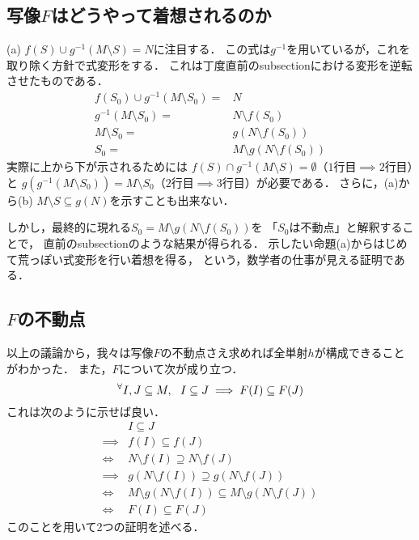 \documentclass[lualatex, ja=standard, a4paper]{bxjsarticle}
\newcommand{\tp}[2]{\texorpdfstring{#1}{#2}}
\begin{document}
    \subsection{写像\tp{$F$}{F}はどうやって着想されるのか}
    (a) $f(S) \cup g^{-1}(M \setminus S)=N$に注目する．
    この式は$g^{-1}$を用いているが，これを取り除く方針で式変形をする．
    これは丁度直前のsubsectionにおける変形を逆転させたものである．
    \begin{align*}
        f(S_0) \cup g^{-1}(M \setminus S_0)=&N \\
        g^{-1}(M \setminus S_0)=&N \setminus f(S_0) \\
        M \setminus S_0=&g(N \setminus f(S_0)) \\
        S_0=&M \setminus g(N \setminus f(S_0))
    \end{align*}
    実際に上から下が示されるためには
    $f(S) \cap g^{-1}(M \setminus S)=\emptyset$（$1$行目$\implies$$2$行目）と
    $g(g^{-1}(M \setminus S_0))=M \setminus S_0$（$2$行目$\implies$$3$行目）が必要である．
    さらに，(a)から(b) $M \setminus S \subseteq g(N)$を示すことも出来ない．

    しかし，最終的に現れる$S_0=M \setminus g(N \setminus f(S_0))$を
    「$S_0$は不動点」と解釈することで，
    直前のsubsectionのような結果が得られる．
    示したい命題(a)からはじめて荒っぽい式変形を行い着想を得る，
    という，数学者の仕事が見える証明である．

    \subsection{\tp{$F$}{F}の不動点}
    以上の議論から，我々は写像$F$の不動点さえ求めれば全単射$h$が構成できることがわかった．
    また，$F$について次が成り立つ．
    \[ {}^{\forall} I,J \subseteq M,~~ I \subseteq J \implies F(I) \subseteq F(J) \]
    これは次のように示せば良い．
    \begin{align*}
        {}&         I \subseteq J \\
        \implies&   f(I) \subseteq f(J) \\
        \iff&       N \setminus f(I) \supseteq N \setminus f(J) \\
        \implies&   g(N \setminus f(I)) \supseteq g(N \setminus f(J)) \\
        \iff&       M \setminus g(N \setminus f(I)) \subseteq M \setminus g(N \setminus f(J)) \\
        \iff&       F(I) \subseteq F(J)
    \end{align*}
    このことを用いて2つの証明を述べる．
\end{document}
